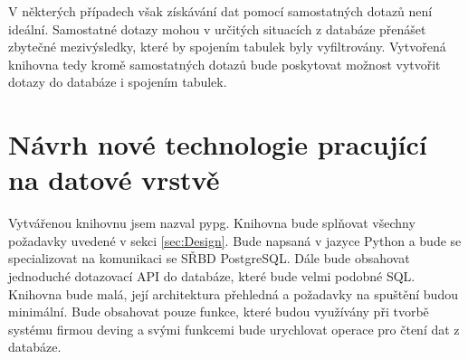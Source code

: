 \documentclass[ing,male,java,dept456]{diploma}						%
\begin{document}
V některých případech však získávání dat pomocí samostatných dotazů není ideální. Samostatné dotazy mohou v určitých situacích z databáze přenášet zbytečné mezivýsledky, které by spojením tabulek byly vyfiltrovány. Vytvořená knihovna tedy kromě samostatných dotazů bude poskytovat možnost vytvořit dotazy do databáze i spojením tabulek.

\section{Návrh nové technologie pracující na datové vrstvě}
\label{sec:Impl}

Vytvářenou knihovnu jsem nazval pypg. Knihovna bude splňovat všechny požadavky uvedené v sekci \ref{sec:Design}. Bude napsaná v jazyce Python a bude se specializovat na komunikaci se SŘBD PostgreSQL. Dále bude obsahovat jednoduché dotazovací API do databáze, které bude velmi podobné SQL. Knihovna bude malá, její architektura přehledná a požadavky na spuštění budou minimální. Bude obsahovat pouze funkce, které budou využívány při tvorbě systému firmou deving a svými funkcemi bude urychlovat operace pro čtení dat z databáze. \\
\end{document}
